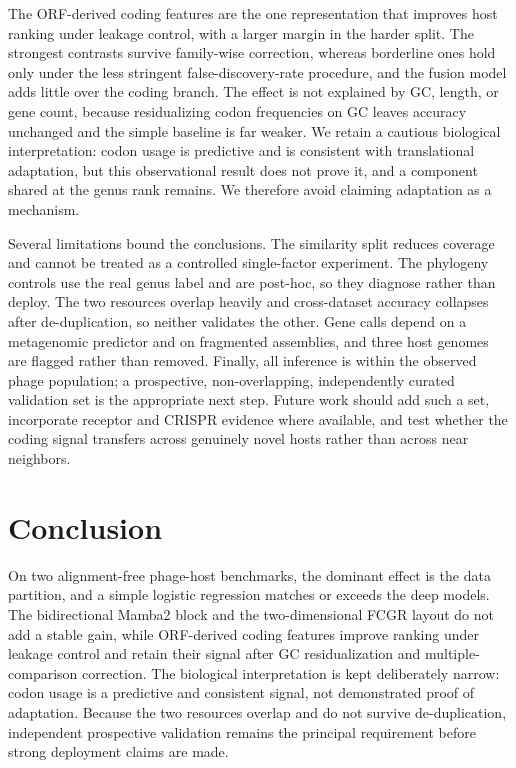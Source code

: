 \documentclass[utf8]{FrontiersinVancouver}
\begin{document}
The ORF-derived coding features are the one representation that improves host ranking under leakage control, with a larger margin in the harder split. The strongest contrasts survive family-wise correction, whereas borderline ones hold only under the less stringent false-discovery-rate procedure, and the fusion model adds little over the coding branch. The effect is not explained by GC, length, or gene count, because residualizing codon frequencies on GC leaves accuracy unchanged and the simple baseline is far weaker. We retain a cautious biological interpretation: codon usage is predictive and is consistent with translational adaptation, but this observational result does not prove it, and a component shared at the genus rank remains. We therefore avoid claiming adaptation as a mechanism.

Several limitations bound the conclusions. The similarity split reduces coverage and cannot be treated as a controlled single-factor experiment. The phylogeny controls use the real genus label and are post-hoc, so they diagnose rather than deploy. The two resources overlap heavily and cross-dataset accuracy collapses after de-duplication, so neither validates the other. Gene calls depend on a metagenomic predictor and on fragmented assemblies, and three host genomes are flagged rather than removed. Finally, all inference is within the observed phage population; a prospective, non-overlapping, independently curated validation set is the appropriate next step. Future work should add such a set, incorporate receptor and CRISPR evidence where available, and test whether the coding signal transfers across genuinely novel hosts rather than across near neighbors.

\section{Conclusion}

On two alignment-free phage-host benchmarks, the dominant effect is the data partition, and a simple logistic regression matches or exceeds the deep models. The bidirectional Mamba2 block and the two-dimensional FCGR layout do not add a stable gain, while ORF-derived coding features improve ranking under leakage control and retain their signal after GC residualization and multiple-comparison correction. The biological interpretation is kept deliberately narrow: codon usage is a predictive and consistent signal, not demonstrated proof of adaptation. Because the two resources overlap and do not survive de-duplication, independent prospective validation remains the principal requirement before strong deployment claims are made.
\end{document}
